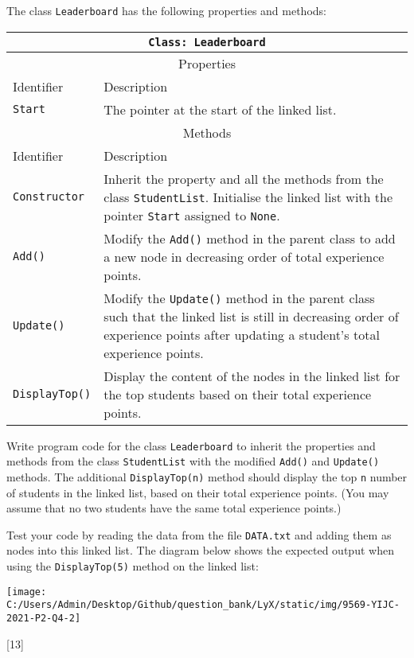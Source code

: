 The class \texttt{Leaderboard} has the following properties and methods: 
\noindent \begin{center}
\begin{tabular}{|l|l|}
\hline 
\multicolumn{2}{|c|}{\texttt{Class: Leaderboard}}\tabularnewline
\hline 
\multicolumn{2}{|c|}{Properties}\tabularnewline
\hline 
\texttt{\hspace{0.01\columnwidth}}Identifier & \texttt{\hspace{0.05\columnwidth}}Description\tabularnewline
\hline 
\texttt{Start} & The pointer at the start of the linked list.\tabularnewline
\hline 
\multicolumn{2}{|c|}{Methods}\tabularnewline
\hline 
\texttt{\hspace{0.01\columnwidth}}Identifier & \texttt{\hspace{0.05\columnwidth}}Description\tabularnewline
\hline 
\texttt{Constructor} & Inherit the property and all the methods from the class \texttt{StudentList}.
Initialise the linked list with the pointer \texttt{Start} assigned
to \texttt{None}.\tabularnewline
\hline 
\texttt{Add()} & Modify the \texttt{Add()} method in the parent class to add a new
node in decreasing order of total experience points.\tabularnewline
\hline 
\texttt{Update()} & Modify the \texttt{Update()} method in the parent class such that
the linked list is still in decreasing order of experience points
after updating a student\textquoteright s total experience points.\tabularnewline
\hline 
\texttt{DisplayTop()} & Display the content of the nodes in the linked list for the top students
based on their total experience points.\tabularnewline
\hline 
\end{tabular}
\par\end{center}

Write program code for the class \texttt{Leaderboard} to inherit the
properties and methods from the class \texttt{StudentList} with the
modified \texttt{Add()} and \texttt{Update()} methods. The additional
\texttt{DisplayTop(n)} method should display the top \texttt{n} number
of students in the linked list, based on their total experience points.
(You may assume that no two students have the same total experience
points.) 

Test your code by reading the data from the file \texttt{DATA.txt}
and adding them as nodes into this linked list. The diagram below
shows the expected output when using the \texttt{DisplayTop(5)} method
on the linked list: 
\noindent \begin{center}
\texttt{[image: C:/Users/Admin/Desktop/Github/question\_bank/LyX/static/img/9569-YIJC-2021-P2-Q4-2]}
\par\end{center}

\hfill{}{[}13{]}